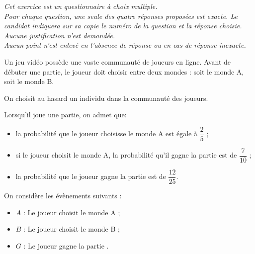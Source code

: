 \medskip

\emph{Cet exercice est un questionnaire à choix multiple.\\
Pour chaque question, une seule des quatre réponses proposées est exacte. Le candidat indiquera sur sa copie le numéro de la question et la réponse choisie.\\
Aucune justification n'est demandée.\\
Aucun point n'est enlevé en l'absence de réponse ou en cas de réponse inexacte.}

\bigskip

Un jeu vidéo possède une vaste communauté de joueurs en ligne. Avant de débuter une partie, le joueur doit choisir entre deux \og mondes \fg : soit le monde A, soit le monde B.

\smallskip

On choisit au hasard un individu dans la communauté des joueurs.

Lorsqu'il joue une partie, on admet que:
\begin{itemize}
\item[$\bullet~~$] la probabilité que le joueur choisisse le monde A est égale à $\dfrac25$ ;
\item[$\bullet~~$] si le joueur choisit le monde A, la probabilité qu'il gagne la partie est de $\dfrac{7}{10}$ ;
\item[$\bullet~~$] la probabilité que le joueur gagne la partie est de $\dfrac{12}{25}$.
\end{itemize}

On considère les évènements suivants : 

\begin{itemize}
\item[$\bullet~~$] $A$ : \og Le joueur choisit le monde A \fg{}; 
\item[$\bullet~~$] $B$ : \og Le joueur choisit le monde B \fg{} ;
\item[$\bullet~~$] $G$ : \og Le joueur gagne la partie \fg.
\end{itemize}

\medskip

